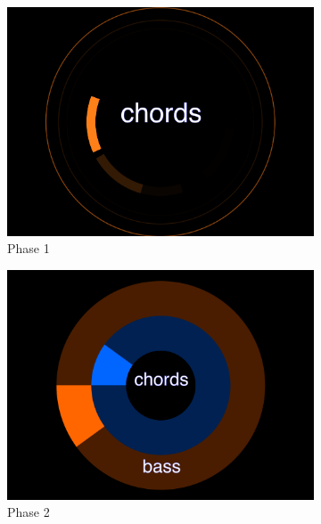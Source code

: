 \begin{figure}
\centering
\begin{subfigure}{.5\textwidth}
  \includegraphics[width=.95\linewidth]{../study-2/results/visualisations/didactic-one.png}
  \caption{Phase 1}
  \label{fig:didactic-one}
\end{subfigure}%
\begin{subfigure}{.5\textwidth}
  \includegraphics[width=.95\linewidth]{../study-2/results/visualisations/didactic-two.png}
  \caption{Phase 2}
  \label{fig:didactic-two}
\end{subfigure}\\
\begin{subfigure}{.5\textwidth}

\end{subfigure}
\end{figure}
